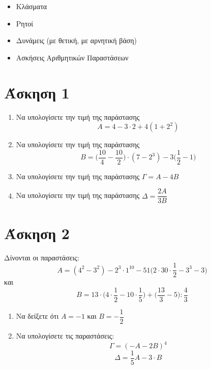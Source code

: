\documentclass[a4paper,10pt]{report}
\begin{document}
\vspace{2em}
\begin{itemize}
\item Κλάσματα
\item Ρητοί
\item Δυνάμεις (με θετική, με αρνητική βάση)
\item Ασκήσεις Αριθμητικών Παραστάσεων 
\end{itemize}


\section*{Άσκηση 1  \hfill \small{}}
\begin{enumerate}[1)]
 \item Να υπολογίσετε την τιμή της παράστασης $$Α=4-3\cdot 2+4(1+2^{2})$$
 \item Να υπολογίσετε την τιμή της παράστασης $$B=\biggl(\dfrac{10}{4}-\dfrac{10}{2}\biggr)\cdot(7-2^{3})-3\biggl(\dfrac{1}{2}-1\biggr)$$
 \item Να υπολογίσετε την τιμή της παράστασης $Γ=Α-4Β$
 \item Να υπολογίσετε την τιμή της παράστασης $Δ=\dfrac{2Α}{3Β}$
\end{enumerate}




\section*{Άσκηση 2  \hfill \small{}}
Δίνονται οι παραστάσεις:
$$ Α=(4^{2}-3^{2})-2^{3}\cdot 1^{10}-51\biggl(2\cdot 30\cdot \dfrac{1}{2}-3^{3}-3\biggr) $$
και 
$$ Β=13\cdot\biggl(4\cdot \dfrac{1}{2}-10\cdot \frac{1}{5}\biggr)+\biggl(\dfrac{13}{3}-5\biggr):\dfrac{4}{3}  $$
\begin{enumerate}[1)]
 \item Να δείξετε ότι $Α=-1$ και $Β=-\dfrac{1}{2}$
 \item Να υπολογίσετε τις παραστάσεις: 
       $$ Γ=(-Α-2Β)^{4}  $$
       $$ Δ=\dfrac{1}{5}Α-3\cdot Β  $$
\end{enumerate}
\end{document}
